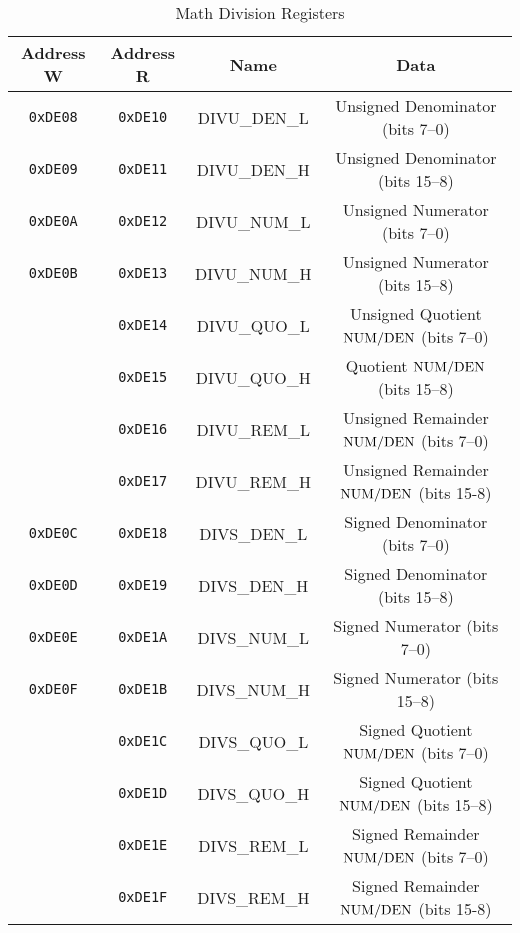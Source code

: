 \begin{table}[ht]
    \begin{center}
        \begin{tabular}{|c|c|c|c|} \hline
            Address W & Address R  & Name & Data \\\hline\hline
            \verb+0xDE08+ & \verb+0xDE10+ & DIVU\_DEN\_L & Unsigned Denominator (bits 7--0) \\ \hline
            \verb+0xDE09+ & \verb+0xDE11+ & DIVU\_DEN\_H & Unsigned Denominator (bits 15--8) \\ \hline
            \verb+0xDE0A+ & \verb+0xDE12+ & DIVU\_NUM\_L & Unsigned Numerator (bits 7--0) \\ \hline
            \verb+0xDE0B+ & \verb+0xDE13+ & DIVU\_NUM\_H & Unsigned Numerator (bits 15--8) \\ \hline
                          & \verb+0xDE14+ & DIVU\_QUO\_L & Unsigned Quotient ${\rm NUM} / {\rm DEN}$ (bits 7--0) \\ \hline
                          & \verb+0xDE15+ & DIVU\_QUO\_H & Quotient ${\rm NUM} / {\rm DEN}$ (bits 15--8) \\ \hline
                          & \verb+0xDE16+ & DIVU\_REM\_L & Unsigned Remainder ${\rm NUM} / {\rm DEN}$ (bits 7--0) \\ \hline
                          & \verb+0xDE17+ & DIVU\_REM\_H & Unsigned Remainder ${\rm NUM} / {\rm DEN}$ (bits 15-8) \\ \hline\hline

            \verb+0xDE0C+ & \verb+0xDE18+ & DIVS\_DEN\_L & Signed Denominator (bits 7--0) \\ \hline
            \verb+0xDE0D+ & \verb+0xDE19+ & DIVS\_DEN\_H & Signed Denominator (bits 15--8) \\ \hline
            \verb+0xDE0E+ & \verb+0xDE1A+ & DIVS\_NUM\_L & Signed Numerator (bits 7--0) \\ \hline
            \verb+0xDE0F+ & \verb+0xDE1B+ & DIVS\_NUM\_H & Signed Numerator (bits 15--8) \\ \hline
                          & \verb+0xDE1C+ & DIVS\_QUO\_L & Signed Quotient ${\rm NUM} / {\rm DEN}$ (bits 7--0) \\ \hline
                          & \verb+0xDE1D+ & DIVS\_QUO\_H & Signed Quotient ${\rm NUM} / {\rm DEN}$ (bits 15--8) \\ \hline
                          & \verb+0xDE1E+ & DIVS\_REM\_L & Signed Remainder ${\rm NUM} / {\rm DEN}$ (bits 7--0) \\ \hline
                          & \verb+0xDE1F+ & DIVS\_REM\_H & Signed Remainder ${\rm NUM} / {\rm DEN}$ (bits 15-8) \\ \hline
        \end{tabular}
    \end{center}
    \caption{Math Division Registers}
    \label{tab:math_div_reg}
\end{table}